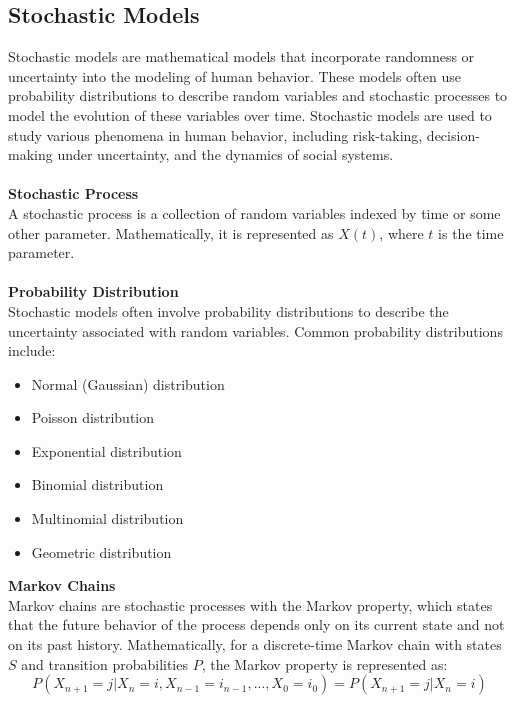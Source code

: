 \documentclass[12pt]{article}
\begin{document}
\subsection{Stochastic Models}\label{sm}
Stochastic models are mathematical models that incorporate randomness or
uncertainty into the modeling of human behavior. These models often use
probability distributions to describe random variables and stochastic
processes to model the evolution of these variables over time. Stochastic
models are used to study various phenomena in human behavior, including
risk-taking, decision-making under uncertainty, and the dynamics of social
systems.\\
\\
\textbf{Stochastic Process}\\
A stochastic process is a collection of random variables indexed by time or some other
parameter. Mathematically, it is represented as \( X(t) \), where \( t \) is the time parameter.\\
\\
\noindent \textbf{Probability Distribution}\\
Stochastic models often involve probability distributions to describe the uncertainty
associated with random variables. Common probability distributions include:\\
\begin{itemize}
   \item Normal (Gaussian) distribution
   \item Poisson distribution
   \item Exponential distribution
   \item Binomial distribution
   \item Multinomial distribution
   \item Geometric distribution
\end{itemize}
\noindent \textbf{Markov Chains}\\
Markov chains are stochastic processes with the Markov property, which states that the future
behavior of the process depends only on its current state and not on its past history.
Mathematically, for a discrete-time Markov chain with states \( S \) and transition
probabilities \( P \), the Markov property is represented as:\\
\begin{equation}
    P(X_{n+1} = j | X_n = i, X_{n-1} = i_{n-1}, ..., X_0 = i_0) = P(X_{n+1} = j | X_n = i)
\end{equation}
\\
\end{document}
